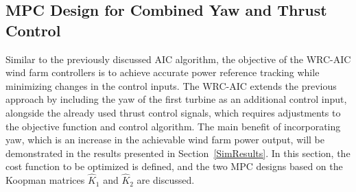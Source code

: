 %



\subsection{MPC Design for Combined Yaw and Thrust Control} \label{qLMPCDesign} 
Similar to the previously discussed AIC algorithm, the objective of the WRC-AIC wind farm controllers is to achieve accurate power reference tracking while minimizing changes in the control inputs. The WRC-AIC extends the previous approach by including the yaw of the first turbine as an additional control input, alongside the already used thrust control signals, which requires adjustments to the objective function and control algorithm. The main benefit of incorporating yaw, which is an increase in the achievable wind farm power output, will be demonstrated in the results presented in Section~\ref{SimResults}. In this section, the cost function to be optimized is defined, and the two MPC designs based on the Koopman matrices $\hat{K}_1$ and $\hat{K}_2$ are discussed.

